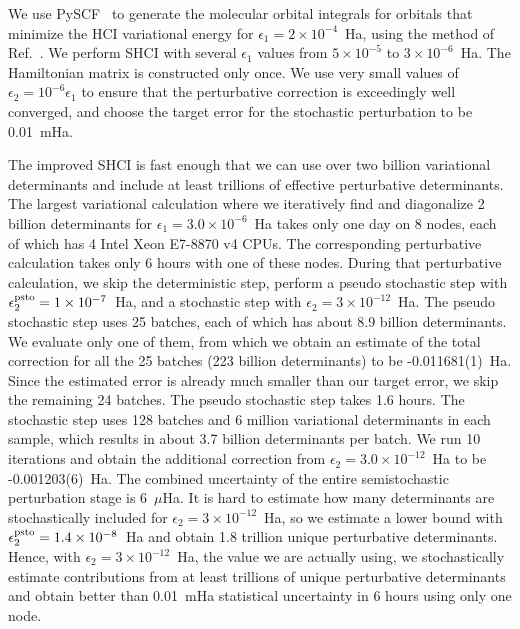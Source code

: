 \documentclass[%
reprint,
 superscriptaddress,
 amsmath,amssymb,
 aps,
]{revtex4-1}
\begin{document}
We use PySCF~\cite{SunCha_etal_PySCF-ComMolSci-18} to generate the molecular orbital integrals for orbitals that minimize the HCI variational
energy for $\epsilon_1=2\times 10^{-4}$~Ha, using the method of Ref.~\cite{SmiMusHolSha-JCTC-17}.
We perform SHCI with several $\epsilon_1$ values from $5\times10^{-5}$ to $3\times10^{-6}$~Ha.
The Hamiltonian matrix is constructed only once.
We use very small values of $\epsilon_2 = 10^{-6} \epsilon_1$  to ensure that the perturbative correction is exceedingly well converged,
and choose the target error for the stochastic perturbation to be 0.01~mHa.

The improved SHCI is fast enough that we can use over two billion variational determinants and include at least trillions of effective perturbative determinants.
The largest variational calculation where we iteratively find and diagonalize 2 billion determinants for $\epsilon_1=3.0\times10^{-6}$~Ha takes only one day on 8 nodes, each of which has 4 Intel Xeon E7-8870 v4 CPUs.
The corresponding perturbative calculation takes only 6 hours with one of these nodes. 
During that perturbative calculation, we skip the deterministic step, perform a pseudo stochastic step with $\epsilon_2^{\rm psto}=1\times10^{-7}$~Ha, and a stochastic step with $\epsilon_2=3\times10^{-12}$~Ha.
The pseudo stochastic step uses 25 batches, each of which has about 8.9 billion determinants.
We evaluate only one of them, from which we obtain an estimate of the total correction for all the 25 batches (223 billion determinants) to be -0.011681(1)~Ha.
Since the estimated error is already much smaller than our target error, we skip the remaining 24 batches.
The pseudo stochastic step takes 1.6 hours.
The stochastic step uses 128 batches and 6 million variational determinants in each sample,
which results in about 3.7 billion determinants per batch.
We run 10 iterations and obtain the additional correction from $\epsilon_2=3.0\times10^{-12}$~Ha to be -0.001203(6)~Ha.
The combined uncertainty of the entire semistochastic perturbation stage is 6~$\mu$Ha.
It is hard to estimate how many determinants are stochastically included for $\epsilon_2=3\times10^{-12}$~Ha, so we estimate a lower bound with $\epsilon_2^{\rm psto}=1.4\times10^{-8}$~Ha and obtain 1.8 trillion unique perturbative determinants.
Hence, with $\epsilon_2=3\times10^{-12}$~Ha, the value we are actually using, we stochastically estimate contributions from at least trillions of unique perturbative determinants and obtain better than 0.01~mHa statistical uncertainty in 6 hours using only one node.
\end{document}

